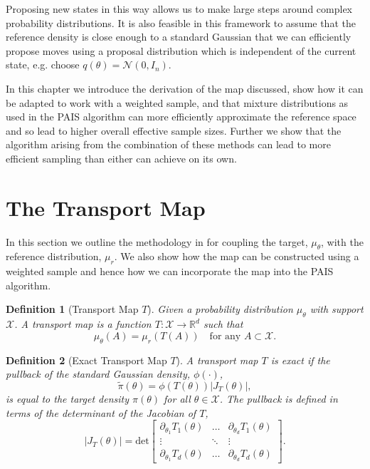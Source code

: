 \documentclass[final]{siamltex}
\newtheorem{dfn}{Definition}[section]
\begin{document}
Proposing new states in this way allows us to make large steps around complex probability distributions.
It is also feasible in this framework to assume that the reference density is close enough to a standard Gaussian that we can efficiently propose moves using a proposal distribution which is independent of the current state, e.g. choose $q(\theta) = \mathcal{N}(0,I_n)$.

In this chapter we introduce the derivation of the map discussed, show how it can be adapted to work
with a weighted sample, and that mixture distributions as used in the PAIS algorithm can more
efficiently approximate the reference space and so lead to higher overall effective sample sizes.
Further we show that the algorithm arising from the combination of these methods can lead to more
efficient sampling than either can achieve on its own.

\section{The Transport Map}

In this section we outline the methodology in \cite{parno2014transport} for coupling the target,
$\mu_{\theta}$, with the reference distribution, $\mu_r$.
We also show how the map can be constructed using a weighted sample and hence how we can incorporate the map into the PAIS algorithm.

\begin{dfn}[Transport Map $T$]
	Given a probability distribution $\mu_\theta$ with support $\mathcal{X}$.
	A transport map is a function $T\colon \mathcal{X} \rightarrow \mathbb{R}^d$ such that
	\[
		\mu_\theta(A) = \mu_r(T(A)) \quad \text{for any } A \subset \mathcal{X}.
	\]
\end{dfn}

\begin{dfn}[Exact Transport Map $T$]
	A transport map $T$ is exact if the {\it pullback} of the standard Gaussian density, $\phi(\cdot)$,
	\begin{equation}\label{eq:pullback}
		\tilde{\pi}(\theta) = \phi(T(\theta))|J_T(\theta)|,
	\end{equation}
	is equal to the target density $\pi(\theta)$ for all $\theta \in \mathcal{X}$. The pullback is defined in terms of the determinant of the Jacobian of $T$,
	\[
		|J_T(\theta)| = \text{det}\begin{bmatrix} \partial_{\theta_1} T_1(\theta) & \dots & \partial_{\theta_d} T_1(\theta) \\ \vdots & \ddots & \vdots \\ \partial_{\theta_1} T_d(\theta) & \dots & \partial_{\theta_d} T_d(\theta) \end{bmatrix}.
	\]
\end{dfn}
\end{document}
